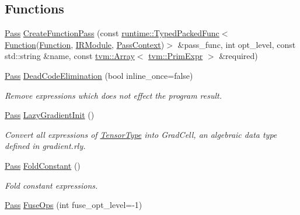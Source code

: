 \subsection*{Functions}
\begin{DoxyCompactItemize}
\item 
\hyperlink{namespacetvm_1_1relay_1_1transform_afa666ade112e9955059095d695238a9a}{Pass} \hyperlink{namespacetvm_1_1relay_1_1transform_aba687537c5fd54db0012c745bba74a85}{Create\+Function\+Pass} (const \hyperlink{classtvm_1_1runtime_1_1TypedPackedFunc}{runtime\+::\+Typed\+Packed\+Func}$<$ \hyperlink{classtvm_1_1relay_1_1Function}{Function}(\hyperlink{classtvm_1_1relay_1_1Function}{Function}, \hyperlink{classtvm_1_1IRModule}{I\+R\+Module}, \hyperlink{namespacetvm_1_1relay_1_1transform_a744a05f8bba3c2ac238ba4569d926184}{Pass\+Context})$>$ \&pass\+\_\+func, int opt\+\_\+level, const std\+::string \&name, const \hyperlink{classtvm_1_1Array}{tvm\+::\+Array}$<$ \hyperlink{classtvm_1_1PrimExpr}{tvm\+::\+Prim\+Expr} $>$ \&required)
\item 
\hyperlink{namespacetvm_1_1relay_1_1transform_afa666ade112e9955059095d695238a9a}{Pass} \hyperlink{namespacetvm_1_1relay_1_1transform_aaa08e0ced82fc7efe515d610104b070c}{Dead\+Code\+Elimination} (bool inline\+\_\+once=false)
\begin{DoxyCompactList}\small\item\em Remove expressions which does not effect the program result. \end{DoxyCompactList}\item 
\hyperlink{namespacetvm_1_1relay_1_1transform_afa666ade112e9955059095d695238a9a}{Pass} \hyperlink{namespacetvm_1_1relay_1_1transform_ab6e60251741cca1e811564b2f03a4a5d}{Lazy\+Gradient\+Init} ()
\begin{DoxyCompactList}\small\item\em Convert all expressions of \hyperlink{classtvm_1_1TensorType}{Tensor\+Type} into Grad\+Cell, an algebraic data type defined in gradient.\+rly. \end{DoxyCompactList}\item 
\hyperlink{namespacetvm_1_1relay_1_1transform_afa666ade112e9955059095d695238a9a}{Pass} \hyperlink{namespacetvm_1_1relay_1_1transform_a41656c71a440f1f9c9eae0aa409d2b22}{Fold\+Constant} ()
\begin{DoxyCompactList}\small\item\em Fold constant expressions. \end{DoxyCompactList}\item 
\hyperlink{namespacetvm_1_1relay_1_1transform_afa666ade112e9955059095d695238a9a}{Pass} \hyperlink{namespacetvm_1_1relay_1_1transform_a2a6be6024a96a84f7230faa2519f1a97}{Fuse\+Ops} (int fuse\+\_\+opt\+\_\+level=-\/1)

\end{DoxyCompactItemize}
